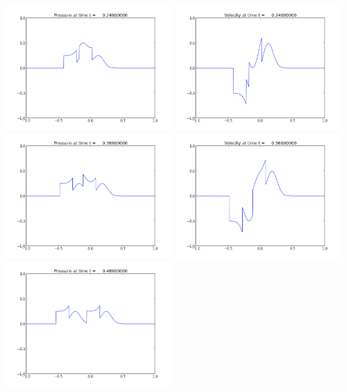 \documentclass[11pt]{article}
\begin{document}
\includegraphics[width=0.475\textwidth]{frame0002fig1.png}
\includegraphics[width=0.475\textwidth]{frame0002fig2.png}
\vskip 10pt 
\includegraphics[width=0.475\textwidth]{frame0003fig1.png}
\includegraphics[width=0.475\textwidth]{frame0003fig2.png}
\vskip 10pt 
\includegraphics[width=0.475\textwidth]{frame0004fig1.png}
\end{document}
